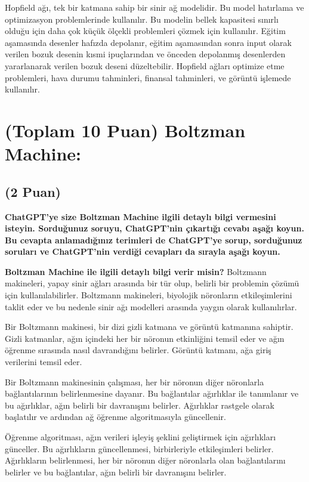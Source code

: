 \documentclass[11pt]{article}
\begin{document}
Hopfield ağı, tek bir katmana sahip bir sinir ağ modelidir. Bu model hatırlama ve optimizasyon problemlerinde kullanılır. Bu modelin bellek kapasitesi sınırlı olduğu için daha çok küçük ölçekli problemleri çözmek için kullanılır.  Eğitim aşamasında desenler hafızda depolanır, eğitim aşamasından sonra input olarak verilen bozuk desenin kısmi ipuçlarından ve önceden depolanmış desenlerden yararlanarak verilen bozuk deseni düzeltebilir. Hopfield ağları optimize etme problemleri, hava durumu tahminleri, finansal tahminleri, ve görüntü işlemede kullanılır.



\section{(Toplam 10 Puan) Boltzman Machine:}

\subsection{(2 Puan)} \textbf{ChatGPT’ye size Boltzman Machine ilgili detaylı bilgi vermesini isteyin. Sorduğunuz soruyu, ChatGPT'nin çıkartığı cevabı aşağı koyun. Bu cevapta anlamadığınız terimleri de ChatGPT’ye sorup, sorduğunuz soruları ve ChatGPT’nin verdiği cevapları da sırayla aşağı koyun.}

\textbf{Boltzman Machine ile ilgili detaylı bilgi verir misin?}
Boltzmann makineleri, yapay sinir ağları arasında bir tür olup, belirli bir problemin çözümü için kullanılabilirler. Boltzmann makineleri, biyolojik nöronların etkileşimlerini taklit eder ve bu nedenle sinir ağı modelleri arasında yaygın olarak kullanılırlar.

Bir Boltzmann makinesi, bir dizi gizli katmana ve görüntü katmanına sahiptir. Gizli katmanlar, ağın içindeki her bir nöronun etkinliğini temsil eder ve ağın öğrenme sırasında nasıl davrandığını belirler. Görüntü katmanı, ağa giriş verilerini temsil eder.

Bir Boltzmann makinesinin çalışması, her bir nöronun diğer nöronlarla bağlantılarının belirlenmesine dayanır. Bu bağlantılar ağırlıklar ile tanımlanır ve bu ağırlıklar, ağın belirli bir davranışını belirler. Ağırlıklar rastgele olarak başlatılır ve ardından ağ öğrenme algoritmasıyla güncellenir.

Öğrenme algoritması, ağın verileri işleyiş şeklini geliştirmek için ağırlıkları günceller. Bu ağırlıkların güncellenmesi, birbirleriyle etkileşimleri belirler. Ağırlıkların belirlenmesi, her bir nöronun diğer nöronlarla olan bağlantılarını belirler ve bu bağlantılar, ağın belirli bir davranışını belirler.
\end{document}
